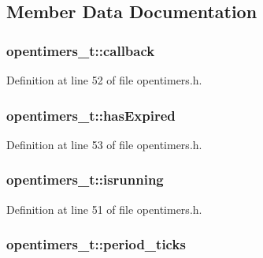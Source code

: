\subsection{Member Data Documentation}
\subsubsection[{\texorpdfstring{callback}{callback}}]{ opentimers\+\_\+t\+::callback}\hypertarget{structopentimers__t_a6059fd28c54d32158e3946b0259aeb34}{}\label{structopentimers__t_a6059fd28c54d32158e3946b0259aeb34}


Definition at line 52 of file opentimers.\+h.

\subsubsection[{\texorpdfstring{has\+Expired}{hasExpired}}]{ opentimers\+\_\+t\+::has\+Expired}\hypertarget{structopentimers__t_a6f3c8db5b71757ee3d2f5b59b00e2dca}{}\label{structopentimers__t_a6f3c8db5b71757ee3d2f5b59b00e2dca}


Definition at line 53 of file opentimers.\+h.

\subsubsection[{\texorpdfstring{isrunning}{isrunning}}]{ opentimers\+\_\+t\+::isrunning}\hypertarget{structopentimers__t_acce4c8365075ca1d6cda0b5d1fe27fb9}{}\label{structopentimers__t_acce4c8365075ca1d6cda0b5d1fe27fb9}


Definition at line 51 of file opentimers.\+h.

\subsubsection[{\texorpdfstring{period\+\_\+ticks}{period_ticks}}]{ opentimers\+\_\+t\+::period\+\_\+ticks}\hypertarget{structopentimers__t_a4cbd7facfbcf83c01a275c8a2e02a448}{}\label{structopentimers__t_a4cbd7facfbcf83c01a275c8a2e02a448}


